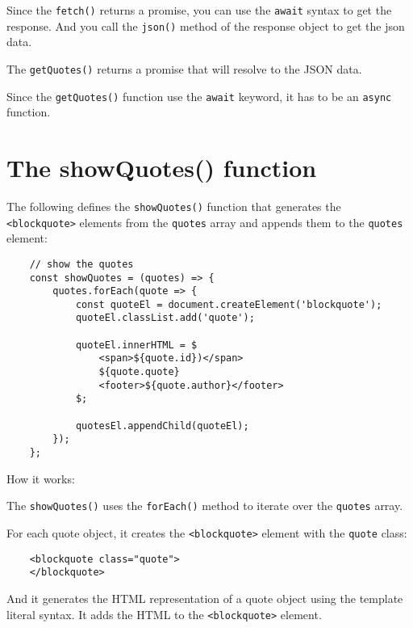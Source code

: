 \documentclass[11pt]{article}
\begin{document}
\noindent
Since the \verb|fetch()| returns a promise, you can use the \verb|await| syntax
to get the response. And you call the \verb|json()| method of the response
object to get the json data.
\newline

\noindent
The \verb|getQuotes()| returns a promise that will resolve to the JSON data.
\newline

\noindent
Since the \verb|getQuotes()| function use the \verb|await| keyword, it has to be
an \verb|async| function.

\section*{The showQuotes() function}

The following defines the \verb|showQuotes()| function that generates
the \verb|<blockquote>| elements from the \verb|quotes| array and appends them
to the \verb|quotes| element:

\begin{lstlisting}
    // show the quotes
    const showQuotes = (quotes) => {
        quotes.forEach(quote => {
            const quoteEl = document.createElement('blockquote');
            quoteEl.classList.add('quote');

            quoteEl.innerHTML = $
                <span>${quote.id})</span>
                ${quote.quote}
                <footer>${quote.author}</footer>
            $;

            quotesEl.appendChild(quoteEl);
        });
    };
\end{lstlisting}

\noindent
How it works:
\newline

\noindent
The \verb|showQuotes()| uses the \verb|forEach()| method to iterate over
the \verb|quotes| array.
\newline

\noindent
For each quote object, it creates the \verb|<blockquote>| element with
the \verb|quote| class:

\begin{lstlisting}
    <blockquote class="quote">
    </blockquote>
\end{lstlisting}

\noindent
And it generates the HTML representation of a quote object using
the template literal syntax. It adds the HTML to the \verb|<blockquote>| element.
\newline
\end{document}
